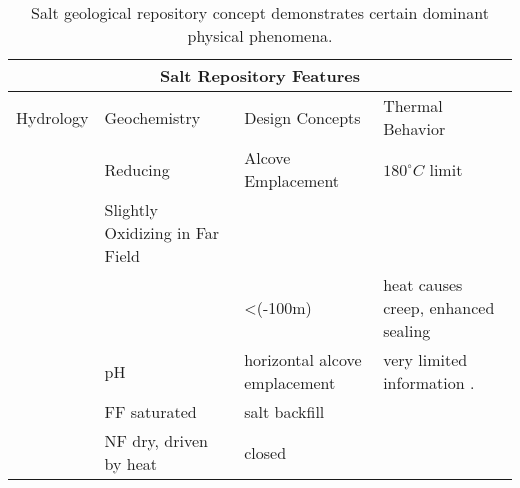 %
\begin{table}[h!]
  \centering
  \footnotesize{
  \begin{tabular}{|l|l|l|l|}
    \multicolumn{4}{c}{\textbf{Salt Repository Features}}\\
    \hline
    Hydrology & Geochemistry & Design Concepts & Thermal Behavior \\ 
    \hline
    &Reducing & Alcove Emplacement & $180^\circ C$ limit \cite{von_lensa_red-impact_2008} \\
    &Slightly Oxidizing in Far Field & & \\
    &&<(-100m)&heat causes creep, enhanced sealing\\
    &pH&horizontal alcove emplacement&very limited information .\\
    &FF saturated&salt backfill&\\
    &NF dry, driven by heat &closed&\\
    \hline
  \end{tabular}
  \caption[Salt Repository Features]{Salt geological repository 
  concept demonstrates certain dominant physical phenomena. }
  \label{tab:salt_tab}
  }
\end{table}


